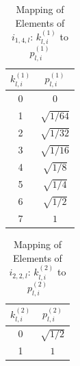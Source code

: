\documentclass[lettersize,journal]{IEEEtran}
\begin{document}
\begin{table}[t]   
\begin{center} 
\centering  
\captionsetup{
  labelsep=newline, %
}
\renewcommand{\arraystretch}{2}  %
\caption{Mapping of Elements of $i_{1,4,l}$: $k_{l,i}^{(1)}$ to $p_{l,i}^{(1)}$}  \label{tabk1}
\begin{tabular}{|c|c|}   
\hline  
\rowcolor{gray!20}
$k_{l,i}^{(1)}$ &$p_{l,i}^{(1)}$  \\
\hline  
0 &0\\
\hline  1&$\sqrt{1/64}$\\
\hline  2&$\sqrt{1/32}$\\
\hline  3&$\sqrt{1/16}$\\
\hline  4&$\sqrt{1/8}$\\
\hline  5&$\sqrt{1/4}$\\
\hline  6&$\sqrt{1/2}$\\
\hline  7&$1$\\
\hline
\end{tabular}   
\end{center}   
\vspace{-12pt}
\end{table}


\begin{table}[t]   
\begin{center} 
\centering  
\captionsetup{
  labelsep=newline, %
}
\renewcommand{\arraystretch}{2}  %
\caption{Mapping of Elements of $i_{2,2,l}$: $k_{l,i}^{(2)}$ to $p_{l,i}^{(2)}$}  \label{tabk2}
\begin{tabular}{|c|c|}   
\hline  
\rowcolor{gray!20}
$k_{l,i}^{(2)}$ &$p_{l,i}^{(2)}$  \\
\hline  0&$\sqrt{1/2}$\\
\hline  1&$1$\\
\hline
\end{tabular}   
\end{center}   
\vspace{-10pt}
\end{table}
\end{document}
